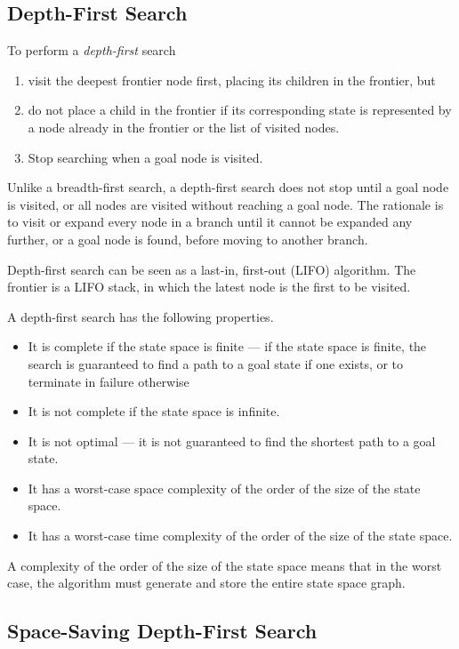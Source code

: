 \subsection{Depth-First Search}

To perform a \emph{depth-first} search
\begin{enumerate}
  \item visit the deepest frontier node first, placing its children in the frontier, but
  \item do not place a child in the frontier if its corresponding state is represented by a node already in the frontier or the list of visited nodes.
  \item Stop searching when a goal node is visited.
\end{enumerate}

Unlike a breadth-first search, a depth-first search does not stop until a goal node is visited, or all nodes are visited without reaching a goal node.
The rationale is to visit or expand every node in a branch until it cannot be expanded any further, or a goal node is found, before moving to another branch.

Depth-first search can be seen as a last-in, first-out (LIFO) algorithm.
The frontier is a LIFO stack, in which the latest node is the first to be visited.

A depth-first search has the following properties.
\begin{itemize}
  \item It is complete if the state space is finite --- if the state space is finite, the search is guaranteed to find a path to a goal state if one exists, or to terminate in failure otherwise
  \item It is not complete if the state space is infinite.
  \item It is not optimal --- it is not guaranteed to find the shortest path to a goal state.
  \item It has a worst-case space complexity of the order of the size of the state space.
  \item It has a worst-case time complexity of the order of the size of the state space.
\end{itemize}

A complexity of the order of the size of the state space means that in the worst case, the algorithm must generate and store the entire state space graph.

\subsection{Space-Saving Depth-First Search}

